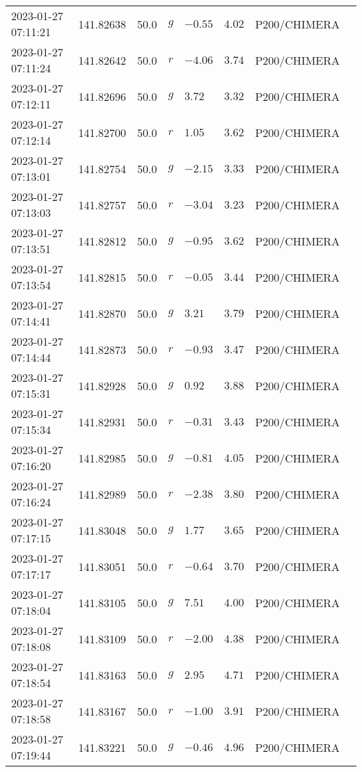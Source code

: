 \documentclass{nature_plusfigure}
\begin{document}
\begin{supplement}
\begin{center}
\begin{longtable}{llllllll}
2023-01-27 07:11:21 & 141.82638 & 50.0 & $g$ & $-0.55$ & $4.02$ & P200/CHIMERA &  \\ 
2023-01-27 07:11:24 & 141.82642 & 50.0 & $r$ & $-4.06$ & $3.74$ & P200/CHIMERA &  \\ 
2023-01-27 07:12:11 & 141.82696 & 50.0 & $g$ & $3.72$ & $3.32$ & P200/CHIMERA &  \\ 
2023-01-27 07:12:14 & 141.82700 & 50.0 & $r$ & $1.05$ & $3.62$ & P200/CHIMERA &  \\ 
2023-01-27 07:13:01 & 141.82754 & 50.0 & $g$ & $-2.15$ & $3.33$ & P200/CHIMERA &  \\ 
2023-01-27 07:13:03 & 141.82757 & 50.0 & $r$ & $-3.04$ & $3.23$ & P200/CHIMERA &  \\ 
2023-01-27 07:13:51 & 141.82812 & 50.0 & $g$ & $-0.95$ & $3.62$ & P200/CHIMERA &  \\ 
2023-01-27 07:13:54 & 141.82815 & 50.0 & $r$ & $-0.05$ & $3.44$ & P200/CHIMERA &  \\ 
2023-01-27 07:14:41 & 141.82870 & 50.0 & $g$ & $3.21$ & $3.79$ & P200/CHIMERA &  \\ 
2023-01-27 07:14:44 & 141.82873 & 50.0 & $r$ & $-0.93$ & $3.47$ & P200/CHIMERA &  \\ 
2023-01-27 07:15:31 & 141.82928 & 50.0 & $g$ & $0.92$ & $3.88$ & P200/CHIMERA &  \\ 
2023-01-27 07:15:34 & 141.82931 & 50.0 & $r$ & $-0.31$ & $3.43$ & P200/CHIMERA &  \\ 
2023-01-27 07:16:20 & 141.82985 & 50.0 & $g$ & $-0.81$ & $4.05$ & P200/CHIMERA &  \\ 
2023-01-27 07:16:24 & 141.82989 & 50.0 & $r$ & $-2.38$ & $3.80$ & P200/CHIMERA &  \\ 
2023-01-27 07:17:15 & 141.83048 & 50.0 & $g$ & $1.77$ & $3.65$ & P200/CHIMERA &  \\ 
2023-01-27 07:17:17 & 141.83051 & 50.0 & $r$ & $-0.64$ & $3.70$ & P200/CHIMERA &  \\ 
2023-01-27 07:18:04 & 141.83105 & 50.0 & $g$ & $7.51$ & $4.00$ & P200/CHIMERA &  \\ 
2023-01-27 07:18:08 & 141.83109 & 50.0 & $r$ & $-2.00$ & $4.38$ & P200/CHIMERA &  \\ 
2023-01-27 07:18:54 & 141.83163 & 50.0 & $g$ & $2.95$ & $4.71$ & P200/CHIMERA &  \\ 
2023-01-27 07:18:58 & 141.83167 & 50.0 & $r$ & $-1.00$ & $3.91$ & P200/CHIMERA &  \\ 
2023-01-27 07:19:44 & 141.83221 & 50.0 & $g$ & $-0.46$ & $4.96$ & P200/CHIMERA &  \\ 

\end{longtable}
\end{center}
\end{supplement}
\end{document}
